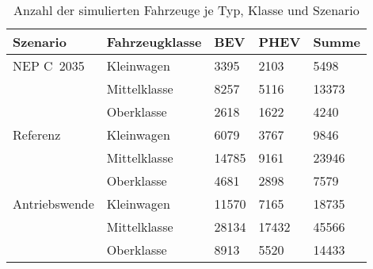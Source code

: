 {
\renewcommand{\arraystretch}{1.2}%
\begin{table}[H]
	\begin{center}
		\caption{Anzahl der simulierten Fahrzeuge je Typ, Klasse und Szenario}
		\begin{tabu} to \textwidth {X[1] X[1] X[1, r] X[1, r] X[1, r]}
			\toprule
			Szenario         & Fahrzeugklasse & BEV         & PHEV        & Summe       \\ \midrule
			NEP C~\num{2035} & Kleinwagen     & \num{3395}  & \num{2103}  & \num{5498}  \\
							 & Mittelklasse   & \num{8257}  & \num{5116}  & \num{13373} \\
							 & Oberklasse     & \num{2618}  & \num{1622}  & \num{4240}  \\ \midrule
			Referenz         & Kleinwagen     & \num{6079}  & \num{3767}  & \num{9846}  \\
							 & Mittelklasse   & \num{14785} & \num{9161}  & \num{23946} \\
							 & Oberklasse     & \num{4681}  & \num{2898}  & \num{7579}  \\ \midrule
			Antriebswende    & Kleinwagen     & \num{11570} & \num{7165}  & \num{18735} \\
							 & Mittelklasse   & \num{28134} & \num{17432} & \num{45566} \\
							 & Oberklasse     & \num{8913}  & \num{5520}  & \num{14433} \\ \bottomrule
		\end{tabu}
		\label{tab:car_count_long}
	\end{center}
	\vspace{-3mm}%
\end{table}
}